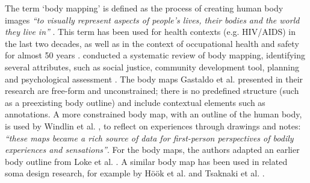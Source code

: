 The term ‘body mapping’ is defined as the process of creating human body images \textit{``to visually represent aspects of people's lives, their bodies and the world they live in''} \cite{gastaldo_body-map_2012}. This term has been used for health contexts (e.g. HIV/AIDS) in the last two decades, as well as in the context of occupational health and safety for almost 50 years \cite{gastaldo_body-map_2012}. \citeauthor{de_jager_embodied_2016} conducted a systematic review of body mapping, identifying several attributes, such as social justice, community development tool, planning and psychological assessment \cite{de_jager_embodied_2016}. The body maps Gastaldo et al. \cite{gastaldo_body-map_2012} presented in their research are free-form and unconstrained; there is no predefined structure (such as a preexisting body outline) and include contextual elements such as annotations. A more constrained body map, with an outline of the human body, is used by Windlin et al. \cite{windlin_soma_2019}, to reflect on experiences through drawings and notes: \textit{“these maps became a rich source of data for first-person perspectives of bodily experiences and sensations”}. For the body maps, the authors adapted an earlier body outline from Loke et al. \cite{loke_bodily_2012}. A similar body map has been used in related soma design research, for example by Höök et al. \cite{hook_soma_2019} and Tsaknaki et al. \cite{tsaknaki_teaching_2019}.

